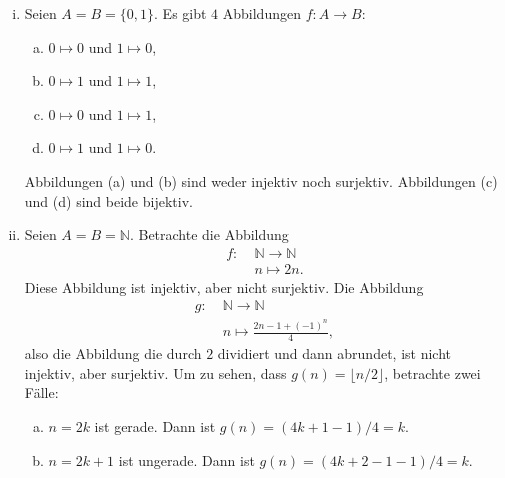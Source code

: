 \documentclass[../main.tex]{subfiles}
\begin{document}
\begin{example}\label{ex:inj-surj}
  \leavevmode
  \begin{enumerate}[(i)]
    \item Seien $A = B = \{0, 1\}$. Es gibt $4$ Abbildungen $f \colon A \rightarrow B$:
      \begin{enumerate}[(a)]
        \item $0 \mapsto 0$ und $1 \mapsto 0$,
        \item $0 \mapsto 1$ und $1 \mapsto 1$,
        \item $0 \mapsto 0$ und $1 \mapsto 1$,
        \item $0 \mapsto 1$ und $1 \mapsto 0$.
      \end{enumerate}
      Abbildungen (a) und (b) sind weder injektiv noch surjektiv. Abbildungen (c) und (d) sind
      beide bijektiv.
    \item Seien $A = B = \mathbb N$. Betrachte die Abbildung
      \begin{align*}
        f \colon & \;\mathbb N \rightarrow \mathbb N \\
        & \;n \mapsto 2n.
      \end{align*}
      Diese Abbildung ist injektiv, aber nicht surjektiv. Die Abbildung
      \begin{align*}
        g \colon & \;\mathbb N \rightarrow \mathbb N \\
           & \; n \mapsto \frac{2n - 1 + {(-1)}^{n}}{4},
      \end{align*}
      also die Abbildung die durch $2$ dividiert und dann abrundet, ist nicht injektiv,
      aber surjektiv. Um zu sehen, dass
      $g(n) = \lfloor{n/2}\rfloor$, betrachte zwei Fälle:
      \begin{enumerate}[(a)]
        \item $n = 2k$ ist gerade. Dann ist $g(n) = (4k+1-1)/4 = k$.
        \item $n = 2k + 1$ ist ungerade. Dann ist $g(n) = (4k + 2 -1 -1)/4 = k$.
      \end{enumerate}
  \end{enumerate}
\end{example}
\end{document}
